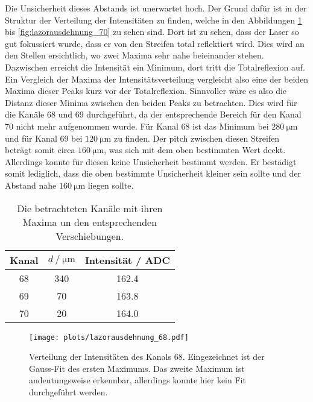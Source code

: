 Die Unsicherheit dieses Abstands ist unerwartet hoch.
Der Grund dafür ist in der Struktur der Verteilung der Intensitäten zu finden, welche in den Abbildungen \ref{fig:lazorausdehnung_68} bis \ref{fig:lazorausdehnung_70} zu sehen sind.
Dort ist zu sehen, dass der Laser so gut fokussiert wurde, dass er von den Streifen total reflektiert wird.
Dies wird an den Stellen ersichtlich, wo zwei Maxima sehr nahe beieinander stehen.
Dazwischen erreicht die Intensität ein Minimum, dort tritt die Totalreflexion auf.
Ein Vergleich der Maxima der Intensitätsverteilung vergleicht also eine der beiden Maxima dieser Peaks kurz vor der Totalreflexion.
Sinnvoller wäre es also die Distanz dieser Minima zwischen den beiden Peaks zu betrachten.
Dies wird für die Kanäle 68 und 69 durchgeführt, da der entsprechende Bereich für den Kanal 70 nicht mehr aufgenommen wurde.
Für Kanal 68 ist das Minimum bei $\SI{280}{\micro\metre}$ und für Kanal 69 bei $\SI{120}{\micro\metre}$ zu finden.
Der pitch zwischen diesen Streifen beträgt somit circa $\SI{160}{\micro\metre}$, was sich mit dem oben bestimmten Wert deckt.
Allerdings konnte für diesen keine Unsicherheit bestimmt werden.
Er bestädigt somit lediglich, dass die oben bestimmte Unsicherheit kleiner sein sollte und der Abstand nahe $\SI{160}{\micro\metre}$ liegen sollte.

\begin{table}[H]
  \centering
  \caption{Die betrachteten Kanäle mit ihren Maxima un den entsprechenden Verschiebungen.}
  \label{tab:maxima}
  \begin{tabular}{S[table-format=2.0] S[table-format=2.0] S[table-format=3.1]}
    \toprule
    {Kanal} & {$d \mathbin{/} \si{\micro\metre}$} & {Intensität / ADC} \\
     & 340 & 162.4 \\
    69 & 70  & 163.8 \\
    70 & 20  & 164.0 \\
    \bottomrule
  \end{tabular}
\end{table}

\begin{figure}[H]
  \centering
  \texttt{[image: plots/lazorausdehnung\_68.pdf]}
  \caption{Verteilung der Intensitäten des Kanals 68. Eingezeichnet ist der Gauss-Fit des ersten Maximums. Das zweite Maximum ist andeutungsweise erkennbar, allerdings konnte hier kein Fit durchgeführt werden.}
  \label{fig:lazorausdehnung_68}
\end{figure}

